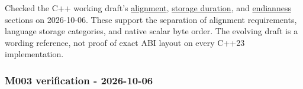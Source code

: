 \hypertarget{appendix-a103e7846d21-m003-independent-wording-checks}{}

Checked the C++ working draft's \href{https://eel.is/c++draft/basic.align}{alignment}, \href{https://eel.is/c++draft/basic.stc}{storage duration}, and \href{https://eel.is/c++draft/bit.endian}{endianness} sections on 2026-10-06. These support the separation of alignment requirements, language storage categories, and native scalar byte order. The evolving draft is a wording reference, not proof of exact ABI layout on every C++23 implementation.

\subsubsection{M003 verification - 2026-10-06}\label{appendix-a103e7846d21-m003-verification---2026-10-06}

\hypertarget{appendix-a103e7846d21-m003-verification---2026-10-06}{}

